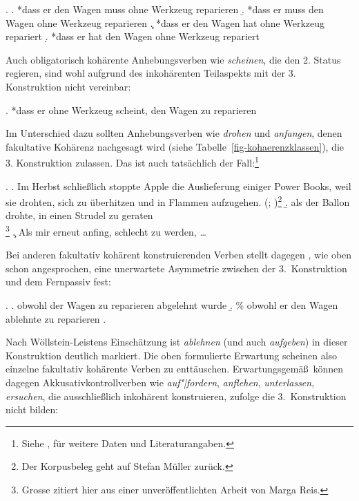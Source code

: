 \ex. \label{ex-3konstr-modal}
\a. *dass er den Wagen muss ohne Werkzeug reparieren \label{ex-3konstr-modal-a}
\b. *dass er muss den Wagen ohne Werkzeug reparieren \label{ex-3konstr-modal-b}
\c. *dass er den Wagen hat ohne Werkzeug repariert \label{ex-3konstr-modal-c}
\d. *dass er hat den Wagen ohne Werkzeug repariert \label{ex-3konstr-modal-d}

Auch obligatorisch kohärente Anhebungsverben wie {\it scheinen}, die den 2. Status regieren, sind wohl aufgrund des inkohärenten Teilaspekts mit der 3. Konstruktion nicht vereinbar:

\ex. *dass er ohne Werkzeug scheint, den Wagen zu reparieren\label{ex-3konstr-scheinen}
 
Im Unterschied dazu sollten Anhebungsverben wie {\it drohen} und {\it anfangen}, denen fakultative Kohärenz nachgesagt wird (siehe Tabelle~\ref{fig-kohaerenzklassen}), die 3. Konstruktion zulassen. Das ist auch tatsächlich der Fall:\footnote{Siehe \citet[Abschnitt~3.2.1]{Meurers:99}, \citet[Abschnitt~2.1.4.3]{Mueller:02} für weitere Daten und Literaturangaben.} 

{
\ex.
\a. Im Herbst schlie\ss lich stoppte Apple die Auslieferung einiger Power Books, weil sie drohten, sich zu überhitzen und in Flammen aufzugehen. \hfill (\citealt[(71a)]{Meurers:99}; \citealt[(111a)]{Mueller:02})\footnote{Der Korpusbeleg geht auf Stefan Müller zurück.} 
\b. als der Ballon drohte, in einen Strudel zu geraten \\ \citep[41a]{Grosse:05}\footnote{Grosse zitiert hier aus einer unveröffentlichten Arbeit von Marga Reis.}
\c. Als mir erneut anfing, schlecht zu werden, \ldots \hfill \citep[(70a)]{Meurers:99}

}
\noindent Bei anderen fakultativ kohärent konstruierenden Verben stellt dagegen \cite{Woellstein:01}, wie oben schon angesprochen, eine unerwartete Asymmetrie zwischen der 3.~Konstruktion und dem Fernpassiv fest:

\ex. 
\a. obwohl der Wagen zu reparieren abgelehnt wurde
\b. \% obwohl er den Wagen ablehnte zu reparieren
\z. \citep[318]{Woellstein:01} 

Nach Wöllstein-Leistens Einschätzung ist {\it ablehnen} (und auch {\it aufgeben}) in dieser Konstruktion deutlich markiert. Die oben formulierte Erwartung scheinen also einzelne fakultativ kohärente Verben zu enttäuschen. Erwartungsgemä\ss\ können dagegen Akkusativkontrollverben wie {\it auf"|fordern}, {\it anflehen}, {\it unterlassen}, {\it ersuchen}, die ausschlie\ss lich inkohärent konstruieren, \cite{Grosse:05} zufolge die 3.~Konstruktion nicht bilden:

